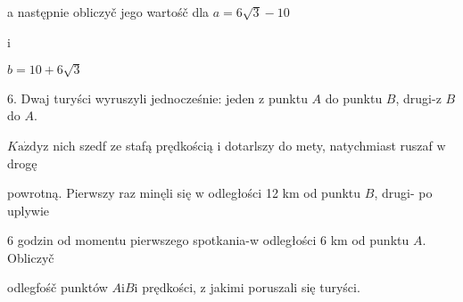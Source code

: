 \documentclass[a4paper,12pt]{article}
\begin{document}
a następnie obliczyč jego wartośč dla $a=6\sqrt{3}-10$

i

$b=10+6\sqrt{3}$

6. Dwaj turyści wyruszyli jednocześnie: jeden $\mathrm{z}$ punktu $A$ do punktu $B$, drugi-z $B$ do $A.$

$K\mathrm{a}\dot{\mathrm{z}}\mathrm{d}\mathrm{y}\mathrm{z}$ nich szedf ze stafą prędkością $\mathrm{i}$ dotarlszy do mety, natychmiast ruszaf $\mathrm{w}$ drogę

powrotną. Pierwszy raz minęli się $\mathrm{w}$ odległości 12 km od punktu $B$, drugi- po uplywie

6 godzin od momentu pierwszego spotkania-w odległości 6 km od punktu $A$. Obliczyč

odlegfośč punktów $A\mathrm{i}B\mathrm{i}$ prędkości, $\mathrm{z}$ jakimi poruszali się turyści.
\end{document}
